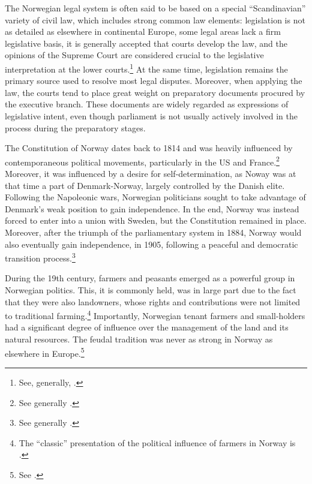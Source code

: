 The Norwegian legal system is often said to be based on a special ``Scandinavian'' variety of civil law, which includes strong common law elements: legislation is not as detailed as elsewhere in continental Europe, some legal areas lack a firm legislative basis, it is generally accepted that courts develop the law, and the opinions of the Supreme Court are considered crucial to the legislative interpretation at the lower courts.\footnote{See, generally, \cite{bernitz07}.} At the same time, legislation remains the primary source used to resolve most legal disputes. Moreover, when applying the law, the courts tend to place great weight on preparatory documents procured by the executive branch. These documents are widely regarded as expressions of legislative intent, even though parliament is not usually actively involved in the process during the preparatory stages.

The Constitution of Norway dates back to 1814 and was heavily influenced by contemporaneous political movements, particularly in the US and France.\footnote{See generally \cite{mestad14}.} Moreover, it was influenced by a desire for self-determination, as Noway was at that time a part of Denmark-Norway, largely controlled by the Danish elite. Following the Napoleonic wars, Norwegian politicians sought to take advantage of Denmark's weak position to gain independence. In the end, Norway was instead forced to enter into a union with Sweden, but the Constitution remained in place. Moreover, after the triumph of the parliamentary system in 1884, Norway would also eventually gain independence, in 1905, following a peaceful and democratic transition process.\footnote{See generally \cite{sejersted15}.}

During the 19th century, farmers and peasants emerged as a powerful group in Norwegian politics. This, it is commonly held, was in large part due to the fact that they were also landowners, whose rights and contributions were not limited to traditional farming.\footnote{The ``classic'' presentation of the political influence of farmers in Norway is \cite{koht26}.} Importantly, Norwegian tenant farmers and small-holders had a significant degree of influence over the management of the land and its natural resources. The feudal tradition was never as strong in Norway as elsewhere in Europe.\footnote{See \cite[59-60]{pryser99}.}

